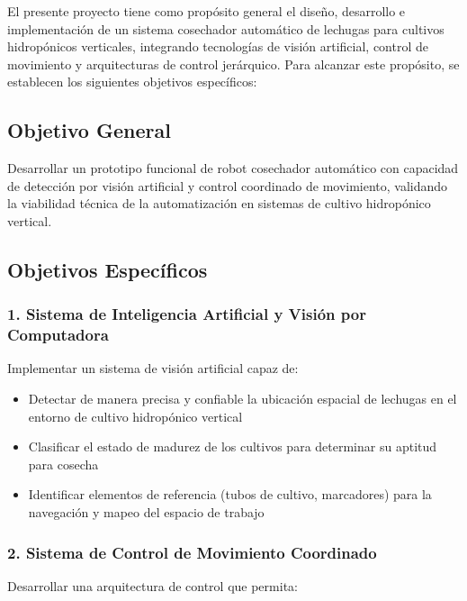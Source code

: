 
El presente proyecto tiene como propósito general el diseño, desarrollo e implementación de un sistema cosechador automático de lechugas para cultivos hidropónicos verticales, integrando tecnologías de visión artificial, control de movimiento y arquitecturas de control jerárquico. Para alcanzar este propósito, se establecen los siguientes objetivos específicos:

\subsection*{Objetivo General}

Desarrollar un prototipo funcional de robot cosechador automático con capacidad de detección por visión artificial y control coordinado de movimiento, validando la viabilidad técnica de la automatización en sistemas de cultivo hidropónico vertical.

\subsection*{Objetivos Específicos}

\subsubsection*{1. Sistema de Inteligencia Artificial y Visión por Computadora}

Implementar un sistema de visión artificial capaz de:

\begin{itemize}
    \item Detectar de manera precisa y confiable la ubicación espacial de lechugas en el entorno de cultivo hidropónico vertical
    \item Clasificar el estado de madurez de los cultivos para determinar su aptitud para cosecha
    \item Identificar elementos de referencia (tubos de cultivo, marcadores) para la navegación y mapeo del espacio de trabajo
\end{itemize}

\subsubsection*{2. Sistema de Control de Movimiento Coordinado}

Desarrollar una arquitectura de control que permita:

